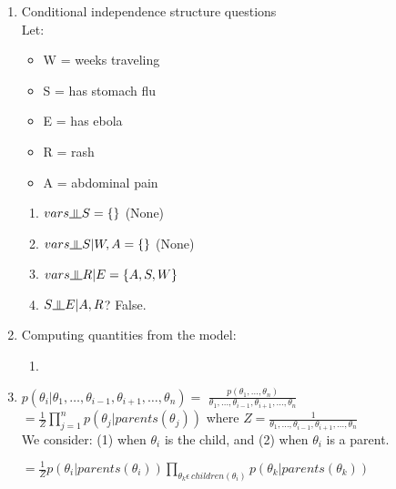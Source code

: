 \documentclass{article}
\newcommand{\indep}{\rotatebox[origin=c]{90}{$\models$}}
\begin{document}
\begin{enumerate}[label=(\alph*)]
\setlength\itemsep{1em}

\item Conditional independence structure questions \\
Let:
\begin{itemize}
\item W = weeks traveling
\item S = has stomach flu
\item E = has ebola
\item R = rash
\item A = abdominal pain

\end{itemize}

\begin{enumerate}[label=\roman*.]

\item $vars \indep S = \{\}$  (None)

\item $vars \indep S | W,A = \{\}$ (None)

\item $vars \indep R | E = \{A,S,W\}$

\item $S \indep E | A,R$? False.

\end{enumerate}

\item Computing quantities from the model: 

\begin{enumerate}[label=\roman*.]

\item

\end{enumerate}


\item

$p(\theta_i|\theta_1,\text{\ldots},\theta_{i-1},\theta_{i+1},\text{\ldots},\theta_n) = $
$\frac{p(\theta_1, \text{\ldots}, \theta_n)} {\theta_1,\text{\ldots},\theta_{i-1},\theta_{i+1},\text{\ldots},\theta_n}$ \\

$= \frac{1}{Z}\prod_{j=1}^n p(\theta_j|parents(\theta_j))$ 
\hfill where $Z=\frac{1}{\theta_1,\text{\ldots},\theta_{i-1},\theta_{i+1},\text{\ldots},\theta_n}$\\

We consider: (1) when $\theta_i$ is the child, and (2) when $\theta_i$ is a parent.

$= \frac{1}{Z}p(\theta_i|parents(\theta_i)) \prod_{\theta_k \epsilon \, children{(\theta_i)}}p(\theta_k|parents(\theta_k))$


\end{enumerate}
\end{document}

